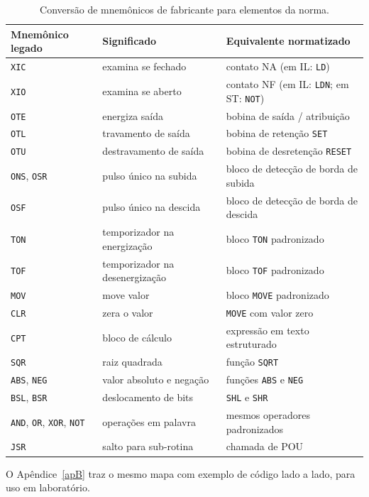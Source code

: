 \begin{table}[H]
  \centering
  \caption{Conversão de mnemônicos de fabricante para elementos da norma.}
  \label{tab:conversao}
  \begin{tabular}{l l l}
    \toprule
    Mnemônico legado & Significado & Equivalente normatizado \\
    \midrule
    \texttt{XIC} & examina se fechado & contato NA (em IL: \texttt{LD}) \\
    \texttt{XIO} & examina se aberto & contato NF (em IL: \texttt{LDN}; em ST: \texttt{NOT}) \\
    \texttt{OTE} & energiza saída & bobina de saída / atribuição \\
    \texttt{OTL} & travamento de saída & bobina de retenção \texttt{SET} \\
    \texttt{OTU} & destravamento de saída & bobina de desretenção \texttt{RESET} \\
    \texttt{ONS}, \texttt{OSR} & pulso único na subida & bloco de detecção de borda de subida \\
    \texttt{OSF} & pulso único na descida & bloco de detecção de borda de descida \\
    \texttt{TON} & temporizador na energização & bloco \texttt{TON} padronizado \\
    \texttt{TOF} & temporizador na desenergização & bloco \texttt{TOF} padronizado \\
    \texttt{MOV} & move valor & bloco \texttt{MOVE} padronizado \\
    \texttt{CLR} & zera o valor & \texttt{MOVE} com valor zero \\
    \texttt{CPT} & bloco de cálculo & expressão em texto estruturado \\
    \texttt{SQR} & raiz quadrada & função \texttt{SQRT} \\
    \texttt{ABS}, \texttt{NEG} & valor absoluto e negação & funções \texttt{ABS} e \texttt{NEG} \\
    \texttt{BSL}, \texttt{BSR} & deslocamento de bits & \texttt{SHL} e \texttt{SHR} \\
    \texttt{AND}, \texttt{OR}, \texttt{XOR}, \texttt{NOT} & operações em palavra & mesmos operadores
      padronizados \\
    \texttt{JSR} & salto para sub-rotina & chamada de POU \\
    \bottomrule
  \end{tabular}
\end{table}

O Apêndice~\ref{apB} traz o mesmo mapa com exemplo de código lado a lado, para uso em laboratório.

